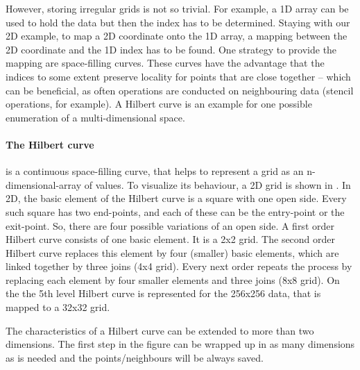 However, storing irregular grids is not so trivial.
For example, a 1D array can be used to hold the data but then the index has to be determined.
Staying with our 2D example, to map a 2D coordinate onto the 1D array, a mapping between the 2D coordinate and the 1D index has to be found.
One strategy to provide the mapping are space-filling curves.
These curves have the advantage that the indices to some extent preserve locality for points that are  close together -- which can be beneficial, as often operations are conducted on neighbouring data (stencil operations, for example).
A Hilbert curve is an example for one possible enumeration of a multi-dimensional space.

\paragraph{The Hilbert curve}
is a continuous space-filling curve, that helps to represent a grid as an n-dimensional-array of values.
To visualize its behaviour, a 2D grid is shown in .
In 2D, the basic element of the Hilbert curve is a square with one open side.
Every such square has two end-points, and each of these can be the entry-point or the exit-point.
So, there are four possible variations of an open side.
A first order Hilbert curve consists of one basic element.
It is a 2x2 grid.
The second order Hilbert curve replaces this element by four (smaller) basic elements, which are linked together by three joins (4x4 grid).
Every next order repeats the process by replacing each element by four smaller elements and three joins (8x8 grid).
On the  the 5th level Hilbert curve is represented for the 256x256 data, that is mapped to a 32x32 grid.

The characteristics of a Hilbert curve can be extended to more than two dimensions.
The first step in the figure can be wrapped up in as many dimensions as is needed and the points/neighbours will be always saved.


